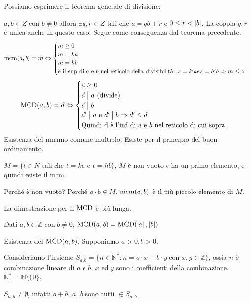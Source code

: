Possiamo esprimere il teorema generale di divisione:

$a, b \in Z$ con $b \neq 0$ allora $\exists q, r \in Z$ tali che $a = q b + r$ e $0 \le r < \left\lvert{b}\right\rvert$. La coppia $q, r$ \`e unica anche in questo caso. Segue come conseguenza dal teorema precedente. 
\[
\operatorname{mcm}(a,b) = m 
\Leftrightarrow
\begin{cases}
m \ge 0 \\
m = k a \\
m = h b \\
\text{\`e il $\sup$ di $a$ e $b$ nel reticolo della divisibilit\`a: } z = k' a e z = h' b \Rightarrow m \le z
\end{cases}
\]
\[
\operatorname{MCD}(a,b) = d
\Leftrightarrow
\begin{cases}
d \ge 0 \\
d \bigm| a \text{ (divide)} \\
d \bigm| b \\
d' \bigm| a \text{ e } d' \bigm| b \Rightarrow d' \le d \\
\text{Quindi d \`e l'$\inf$ di $a$ e $b$ nel reticolo di cui sopra.}
\end{cases}
\]
Esistenza del minimo comune multiplo. Esiste per il principio del buon ordinamento.

$M = \{ t \in N$ tali che $t = k a$ e $t = h b \}$, $M$ \`e non vuoto e ha un primo elemento, e quindi esiste il $\operatorname{mcm}$.

Perch\'e \`e non vuoto? Perch\'e $a \cdot b \in M$. $\operatorname{mcm}(a,b)$ \`e il pi\`u piccolo elemento di $M$.

La dimostrazione per il $\operatorname{MCD}$ \`e pi\`u lunga.

Dati $a, b \in \mathbb{Z}$ con $b \neq 0$, $\operatorname{MCD}(a, b) = \operatorname{MCD}(\left\lvert{a}\right\rvert, \left\lvert{b}\right\rvert)$

Esistenza del $\operatorname{MCD}(a, b)$. Supponiamo $a > 0, b > 0$.

Consideriamo l'insieme $S_{a, b} = \{ n \in \mathbb{N}^{\ast} : n = a \cdot x + b \cdot y$ con $x, y \in \mathbb{Z}\}$, ossia $n$ \`e combinazione lineare di $a$ e $b$. $x$ ed $y$ sono i coefficienti della combinazione. $\mathbb{N}^{\ast} = \mathbb{N} \setminus \{ 0 \}$.

$S_{a, b} \neq \emptyset$, infatti $a+b$, $a$, $b$ sono tutti $\in S_{a,b}$.

